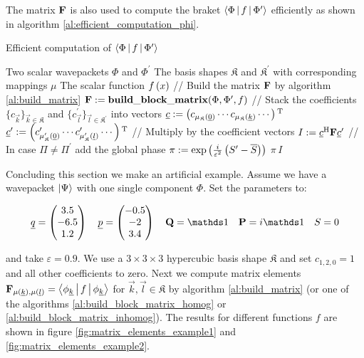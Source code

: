 The matrix $\mathbf{F}$ is also used to compute the braket $\Braket{\Phi|f|\Phi^\prime}$
efficiently as shown in algorithm \ref{al:efficient_computation_phi}.

\begin{algorithm}
\caption{Efficient computation of $\Braket{\Phi| f |\Phi^\prime}$}
\label{al:efficient_computation_phi}
\begin{algorithmic}
  \REQUIRE Two scalar wavepackets $\Phi$ and $\Phi^\prime$
  \REQUIRE The basis shapes $\mathfrak{K}$ and $\mathfrak{K}^\prime$ with corresponding mappings $\mu$
  \REQUIRE The scalar function $f\left( x \right)$
  \STATE // Build the matrix $\mathbf{F}$ by algorithm \ref{al:build_matrix}
  \STATE $\mathbf{F} := \mathbf{build\_block\_matrix}(\Phi, \Phi^\prime, f)$
  \STATE // Stack the coefficients $\{c_{\vec{k}}\}_{\vec{k}\in\mathfrak{K}}$ and $\{c^\prime_{\vec{l}}\}_{\vec{l}\in\mathfrak{K}^\prime}$ into vectors
  \STATE $\underline{c} := \left(c_{\mu_{\mathfrak{K}}(\underline{0})} \cdots c_{\mu_{\mathfrak{K}}(\underline{k})} \cdots \right){}^{\textnormal{T}}$
  \STATE $\underline{c}^\prime := \left(c^\prime_{\mu_{\mathfrak{K}}^\prime(\underline{0})} \cdots c^\prime_{\mu_{\mathfrak{K}}^\prime(\underline{l})} \cdots \right){}^{\textnormal{T}}$
  \STATE // Multiply by the coefficient vectors
  \STATE $I := \underline{c}{}^{\textnormal{H}} \mathbf{F} \underline{c}^\prime$
  \STATE // In case $\Pi \neq \Pi^\prime$ add the global phase
  \STATE $\pi := \exp\left( \frac{i}{\varepsilon^2}\left(S^\prime - \overline{S}\right) \right)$
  \RETURN $\pi \, I$
\end{algorithmic}
\end{algorithm}

Concluding this section we make an artificial example. Assume we have a wavepacket
$\Ket{\Psi}$ with one single component $\Phi$. Set the parameters to:

\begin{equation*}
  \vec{q}  =
  \begin{pmatrix}
    3.5 \\ -6.5 \\ 1.2
  \end{pmatrix}
  \quad
  \vec{p} =
  \begin{pmatrix}
   -0.5 \\ -2 \\ 3.4
  \end{pmatrix}
  \quad
  \mat{Q} = \id
  \quad
  \mat{P} = i \id
  \quad
  S = 0
\end{equation*}

and take $\varepsilon = 0.9$. We use a $3 \times 3 \times 3$ hypercubic basis shape
$\mathfrak{K}$ and set $c_{1,2,0} = 1$ and all other coefficients to zero. Next we
compute matrix elements
$\mathbf{F}_{\mu(\underline{k}), \mu(\underline{l})} = \Braket{\phi_{\underline{k}} | f | \phi_{\underline{k}}}$ for $\vec{k}, \vec{l} \in \mathfrak{K}$
by algorithm \ref{al:build_matrix} (or one of the algorithms \ref{al:build_block_matrix_homog} or \ref{al:build_block_matrix_inhomog}).
The results for different functions $f$ are shown in figure \ref{fig:matrix_elements_example1} and \ref{fig:matrix_elements_example2}.

